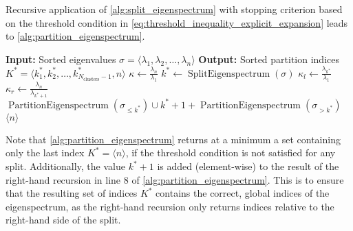 Recursive application of \cref{alg:split_eigenspectrum} with stopping criterion based on the threshold condition in \cref{eq:threshold_inequality_explicit_expansion} leads to \cref{alg:partition_eigenspectrum}.
\begin{algorithm}[H]
    \caption{$\operatorname{PartitionEigenspectrum}(\sigma)$}
    \begin{algorithmic}[1]
        \State \textbf{Input:} Sorted eigenvalues $\sigma = \langle\lambda_1, \lambda_2, \ldots, \lambda_n\rangle$
        \State \textbf{Output:} Sorted partition indices $K^* = \langle k^*_1, k^*_2, \ldots, k^*_{N_{\text{clusters}}-1}, n\rangle$
        \State $\kappa \gets \frac{\lambda_n}{\lambda_1}$
        \State $k^* \gets \operatorname{SplitEigenspectrum}(\sigma)$
        \State $\kappa_l \gets \frac{\lambda_{k^*}}{\lambda_1}$
        \State $\kappa_r \gets \frac{\lambda_n}{\lambda_{k^*+1}}$
            \State \Return $\operatorname{PartitionEigenspectrum}(\sigma_{\leq k^*}) \cup k^* + 1 + \operatorname{PartitionEigenspectrum}(\sigma_{>k^*})$
        \Else
            \State \Return $\langle n \rangle$ 
        \EndIf
    \end{algorithmic}
    \label{alg:partition_eigenspectrum}
\end{algorithm}
Note that \cref{alg:partition_eigenspectrum} returns at a minimum a set containing only the last index $K^*= \langle n \rangle$, if the threshold condition is not satisfied for any split. Additionally, the value $k^* + 1$ is added (element-wise) to the result of the right-hand recursion in line 8 of \cref{alg:partition_eigenspectrum}. This is to ensure that the resulting set of indices $K^*$ contains the correct, global indices of the eigenspectrum, as the right-hand recursion only returns indices relative to the right-hand side of the split.

